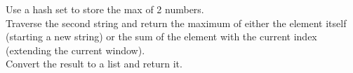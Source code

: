 \documentclass[preview]{standalone}
\begin{document}
Use a hash set to store the max of 2 numbers.\\Traverse the second string and return the maximum of either the element itself (starting a new string) or the sum of the element with the current index (extending the current window).\\Convert the result to a list and return it.\\
\end{document}
